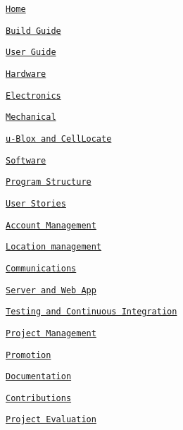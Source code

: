 
\begin{DoxyItemize}
\item \href{./Home}{\tt Home}
\item \href{./Build-Guide}{\tt Build Guide}
\item \href{./User-Guide}{\tt User Guide}
\item \href{./Hardware}{\tt Hardware}
\begin{DoxyItemize}
\item \href{./Hardware%3A-Electronics}{\tt Electronics}
\item \href{./Hardware%3A-Mechanical}{\tt Mechanical}
\item \href{./uBlox-and-CellLocate}{\tt u-\/\+Blox and Cell\+Locate}
\end{DoxyItemize}
\item \href{./Software}{\tt Software}
\begin{DoxyItemize}
\item \href{./Program-Structure}{\tt Program Structure}
\item \href{./User-Stories}{\tt User Stories}
\item \href{./Account-Management}{\tt Account Management}
\item \href{./Location-management}{\tt Location management}
\item \href{./Communications}{\tt Communications}
\item \href{./Server-and-Web-App}{\tt Server and Web App}
\item \href{./Testing-and-Continuous-Integration}{\tt Testing and Continuous Integration}
\end{DoxyItemize}
\item \href{./Project-Management}{\tt Project Management}
\begin{DoxyItemize}
\item \href{./Promotion}{\tt Promotion}
\item \href{./Documentation}{\tt Documentation}
\item \href{./Contributions}{\tt Contributions}
\item \href{./Project-Evaluation}{\tt Project Evaluation} 
\end{DoxyItemize}
\end{DoxyItemize}